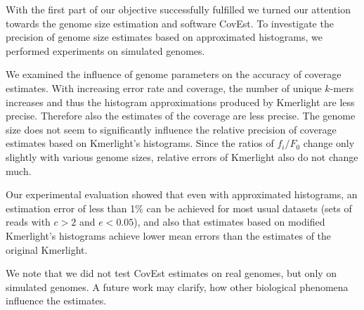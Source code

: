 \medskip

With the first part of our objective successfully fulfilled we turned our attention towards
the genome size estimation and software CovEst. To investigate the precision of genome size 
estimates based on approximated histograms, we performed experiments on simulated genomes.

We examined the influence of genome parameters on the accuracy of coverage estimates.
With increasing error rate and coverage, the number of unique $k$-mers increases
and thus the histogram approximations produced by Kmerlight are less precise. Therefore
also the estimates of the coverage are less precise. The genome size does not seem to 
significantly influence the relative precision of coverage estimates based on Kmerlight's
histograms. Since the ratios of $f_i/F_0$ change only slightly with
various genome sizes, relative errors of Kmerlight also do not change much.

Our experimental evaluation showed that even with approximated histograms, an estimation error
of less than 1\% can be achieved for most usual datasets (sets of reads with $c > 2$ 
and $e < 0.05$), and also that estimates based on modified Kmerlight's histograms achieve 
lower mean errors than the estimates of the original Kmerlight. 

We note that we did not test CovEst estimates on real genomes, but only on simulated genomes. 
A future work may clarify, how other biological phenomena influence the estimates. 








